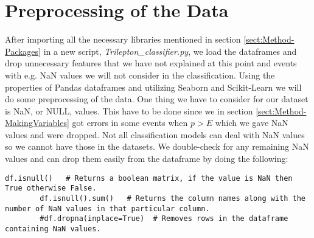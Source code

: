 \documentclass[a4paper, american, 12pt]{report}
\begin{document}
	\section{Preprocessing of the Data}
	\label{sect:Method-PrepData}
	After importing all the necessary libraries mentioned in section \ref{sect:Method-Packages} in a new script, \textit{Trilepton\_classifier.py}, we load the dataframes and drop unnecessary features that we have not explained at this point and events with e.g. NaN values we will not consider in the classification. Using the properties of Pandas dataframes and utilizing Seaborn and Scikit-Learn we will do some preprocessing of the data. One thing we have to consider for our dataset is NaN, or NULL, values. This have to be done since we in section \ref{sect:Method-MakingVariables} got errors in some events when $p>E$ which we gave NaN values and were dropped. Not all classification models can deal with NaN values so we cannot have those in the datasets. We double-check for any remaining NaN values and can drop them easily from the dataframe by doing the following:
	\begin{lstlisting}[caption=Check NaN values in the datasets to be removed if existing., label=Lst:NULL_check]
		df.isnull()   # Returns a boolean matrix, if the value is NaN then True otherwise False.
		df.isnull().sum()   # Returns the column names along with the number of NaN values in that particular column.
		#df.dropna(inplace=True)  # Removes rows in the dataframe containing NaN values.
	\end{lstlisting}
\end{document}
